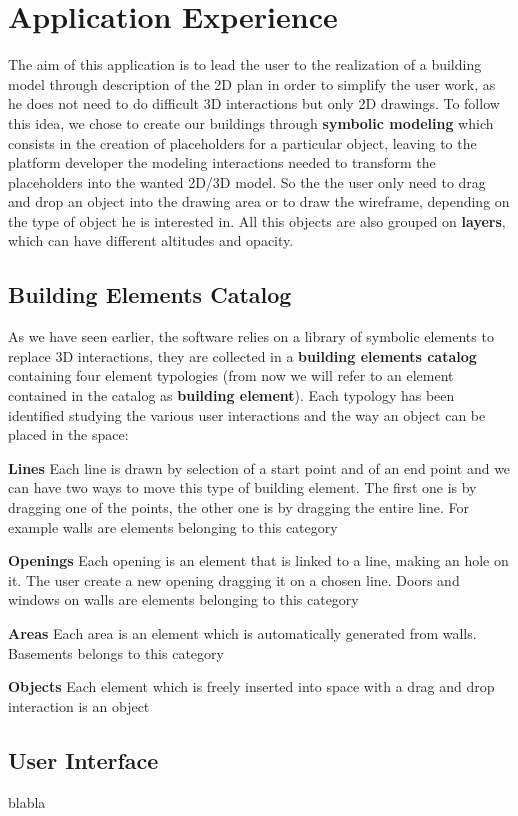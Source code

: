 \section{Application Experience}\label{sec:application}

The aim of this application is to lead the user to the realization of a building model through description of the 2D plan in order to simplify the user work, as he does not need to do difficult 3D interactions but only 2D drawings. To follow this idea, we chose to create our buildings through \textbf{symbolic modeling} which consists in the creation of placeholders for a particular object, leaving to the platform developer the modeling interactions needed to transform the placeholders into the wanted 2D/3D model. So the the user only need to drag and drop an object into the drawing area or to draw the wireframe, depending on the type of object he is interested in. All this objects are also grouped on \textbf{layers}, which can have different altitudes and opacity.

\subsection{Building Elements Catalog}\label{ssec:catalog}

As we have seen earlier, the software relies on a library of symbolic elements to replace 3D interactions, they are collected in a \textbf{building elements catalog} containing four element typologies (from now we will refer to an element contained in the catalog as \textbf{building element}). Each typology has been identified studying the various user interactions and the way an object can be placed in the space:

\textbf{Lines} Each line is drawn by selection of a start point and of an end point and we can have two ways to move this type of building element. The first one is by dragging one of the points, the other one is by dragging the entire line. For example walls are elements belonging to this category

\textbf{Openings} Each opening is an element that is linked to a line, making an hole on it. The user create a new opening dragging it on a chosen line. Doors and windows on walls are elements belonging to this category

\textbf{Areas} Each area is an element which is automatically generated from walls. Basements belongs to this category

\textbf{Objects} Each element which is freely inserted into space with a drag and drop interaction is an object


\subsection{User Interface}\label{ssec:ui}

blabla


